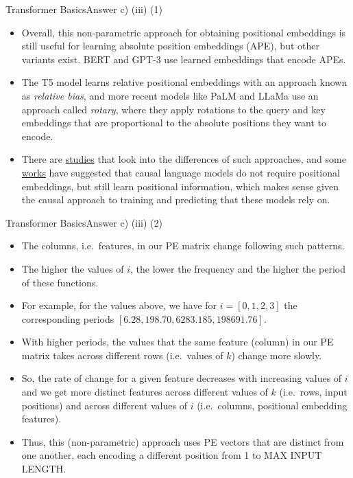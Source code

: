 \documentclass[t]{beamer}
\begin{document}
\begin{frame}{Transformer Basics}{Answer c) (iii) (1)}
\begin{itemize}
        \item Overall, this non-parametric approach for obtaining
              positional embeddings is still useful for learning absolute
              position embeddings (APE), but other variants exist.
              BERT and GPT-3 use learned embeddings that encode APEs.
        \item The T5 model learns relative positional embeddings with an
              approach known as \emph{relative bias}, and more recent
              models like PaLM and LLaMa use an approach called
              \emph{rotary}, where they apply rotations to the query and
              key embeddings that are proportional to the absolute
              positions they want to encode.
        \item There are
              \href{https://arxiv.org/pdf/2305.19466.pdf}{studies} that
              look into the differences of such approaches, and some
              \href{https://aclanthology.org/2022.findings-emnlp.99.pdf}{works}
              have suggested that causal language models do not require
              positional embeddings, but still learn positional
              information, which makes sense given the causal approach
              to training and predicting that these models rely on.
    \end{itemize}
\end{frame}

\begin{frame}{Transformer Basics}{Answer c) (iii) (2)}
    \begin{itemize}
        \item The columns, i.e.\ features, in our PE matrix change following
              such patterns.
        \item The higher the values of $i$, the lower the frequency and
              the higher the period of these functions.
        \item For example, for the values above, we have for
              $i = [0, 1, 2, 3]$ the corresponding periods
              $[6.28, 198.70, 6283.185, 198691.76]$.
        \item With higher periods, the values that the same feature (column) in
              our PE matrix takes across different rows (i.e.\ values of $k$)
              change more slowly.
        \item So, the rate of change for a given feature decreases with
              increasing values of $i$ and we get more distinct features
              across different values of $k$ (i.e.\ rows, input positions) and
              across different values of $i$ (i.e.\ columns, positional
              embedding features).
        \item Thus, this (non-parametric) approach uses PE vectors
              that are distinct from one another, each encoding a
              different position from 1 to MAX INPUT LENGTH.
    \end{itemize}
\end{frame}
\end{document}
